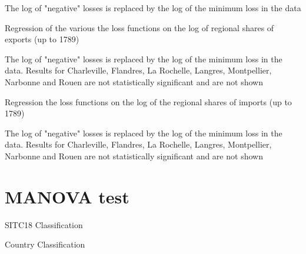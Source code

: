 \documentclass[12pt,a4paper,notitlepage,english]{article}
\begin{document}
\begin{appendix}
\begin{table}[h!]
	
	The log of "negative" losses is replaced by the log of the minimum loss in the data
\end{table}

\begin{landscape}
	\begin{table}[h!]
		\caption{Regression of the various the loss functions on the log of regional shares of exports (up to 1789)}
		\label{Individual_regressions_region_exports}
		\footnotesize
		
		
		The log of "negative" losses is replaced by the log of the minimum loss in the data. Results for Charleville, Flandres, La Rochelle, Langres, Montpellier, Narbonne and Rouen are not statistically significant and are not shown
	\end{table}
	
	\begin{table}[h!]
		\caption{Regression the loss functions on the log of the regional shares of imports (up to 1789)}
		\label{Individual_regressions_region_imports}
		\footnotesize
		
		
		The log of "negative" losses is replaced by the log of the minimum loss in the data. Results for Charleville, Flandres, La Rochelle, Langres, Montpellier, Narbonne and Rouen are not statistically significant and are not shown
	\end{table}
	
\end{landscape}


\section{MANOVA test} 
\begin{table}[h!]
\centering
\caption{SITC18 Classification}
\label{tab:class_sitc18}

\end{table}
\begin{table}[h!]
\centering
\caption{Country Classification}
\label{tab:class_pays7}

\end{table}





\end{appendix}
\end{document}
